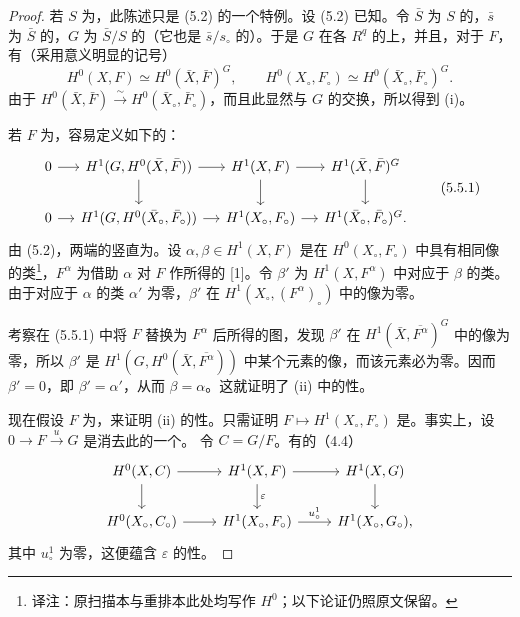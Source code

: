 \begin{proof}
若 $S$ 为，此陈述只是 (5.2) 的一个特例。设 (5.2) 已知。令 $\bar S$ 为 $S$ 的，$\bar s$ 为 $\bar S$ 的，$G$ 为 $\bar S/S$ 的（它也是 $\bar s/s_\circ$ 的）。于是 $G$ 在各 $R^q$ 的上，并且，对于 $F$，有（采用意义明显的记号）
\[
H^0(X,F)\simeq H^0(\bar X,\bar F)^G,\qquad
H^0(X_\circ,F_\circ)\simeq H^0(\bar X_\circ,\bar F_\circ)^G.
\]
由于 $H^0(\bar X,\bar F)\xrightarrow{\sim}H^0(\bar X_\circ,\bar F_\circ)$，而且此显然与 $G$ 的交换，所以得到 (i)。

若 $F$ 为，容易定义如下的：
\[
\begin{tikzcd}[column sep=small]
0\arrow[r]&H^1(G,H^0(\bar X,\bar F))\arrow[r]\arrow[d]&H^1(X,F)\arrow[r]\arrow[d]&H^1(\bar X,\bar F)^G\arrow[d]\\
0\arrow[r]&H^1(G,H^0(\bar X_\circ,\bar F_\circ))\arrow[r]&H^1(X_\circ,F_\circ)\arrow[r]&H^1(\bar X_\circ,\bar F_\circ)^G.
\end{tikzcd}\tag{5.5.1}
\]
由 (5.2)，两端的竖直为。设 $\alpha,\beta\in H^1(X,F)$ 是在 $H^0(X_\circ,F_\circ)$ 中具有相同像的类\footnote{译注：原扫描本与重排本此处均写作 $H^0$；以下论证仍照原文保留。}，$F^\alpha$ 为借助 $\alpha$ 对 $F$ 作所得的 [1]。令 $\beta'$ 为 $H^1(X,F^\alpha)$ 中对应于 $\beta$ 的类。由于对应于 $\alpha$ 的类 $\alpha'$ 为零，$\beta'$ 在 $H^1(X_\circ,(F^\alpha)_\circ)$ 中的像为零。

考察在 (5.5.1) 中将 $F$ 替换为 $F^\alpha$ 后所得的图，发现 $\beta'$ 在 $H^1(\bar X,\overline{F^\alpha})^G$ 中的像为零，所以 $\beta'$ 是 $H^1(G,H^0(\bar X,\overline{F^\alpha}))$ 中某个元素的像，而该元素必为零。因而 $\beta'=0$，即 $\beta'=\alpha'$，从而 $\beta=\alpha$。这就证明了 (ii) 中的性。

现在假设 $F$ 为，来证明 (ii) 的性。只需证明 $F\mapsto H^1(X_\circ,F_\circ)$ 是。事实上，设 $0\to F\xrightarrow{u}G$ 是消去此的一个。
令 $C=G/F$。有的（4.4）
\[
\begin{tikzcd}
H^0(X,C)\arrow[r]\arrow[d]&H^1(X,F)\arrow[r]\arrow[d,"\varepsilon"]&H^1(X,G)\arrow[d]\\
H^0(X_\circ,C_\circ)\arrow[r]&H^1(X_\circ,F_\circ)\arrow[r,"u^1_\circ"]&H^1(X_\circ,G_\circ),
\end{tikzcd}
\]
其中 $u^1_\circ$ 为零，这便蕴含 $\varepsilon$ 的性。


\end{proof}
